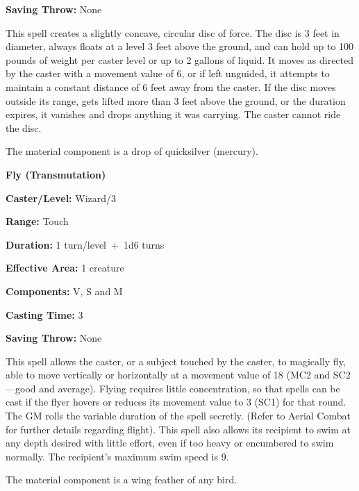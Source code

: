 \begin{multicols}{2}
\begin{minipage}{\columnwidth}
\noindent \textbf{Saving Throw:} None

\end{minipage}

This spell creates a slightly concave, circular disc of force.  The disc is 3 feet in diameter, always floats at a level 3 feet above the ground, and can hold up to 100 pounds of weight per caster level or up to 2 gallons of liquid.  It moves as directed by the caster with a movement value of 6, or if left unguided, it attempts to maintain a constant distance of 6 feet away from the caster.  If the disc moves outside its range, gets lifted more than 3 feet above the ground, or the duration expires, it vanishes and drops anything it was carrying.  The caster cannot ride the disc.

The material component is a drop of quicksilver (mercury).

\vspace{1em}

\noindent
\begin{minipage}{\columnwidth}

\noindent \textbf{Fly (Transmutation)}

\noindent \textbf{Caster/Level:} Wizard/3

\noindent \textbf{Range:} Touch

\noindent \textbf{Duration:} 1 turn/level~+~1d6 turns

\noindent \textbf{Effective Area:} 1 creature

\noindent \textbf{Components:} V, S and M

\noindent \textbf{Casting Time:} 3

\noindent \textbf{Saving Throw:} None

\end{minipage}

This spell allows the caster, or a subject touched by the caster, to magically fly, able to move vertically or horizontally at a movement value of 18 (MC2 and SC2---good and average).  Flying requires little concentration, so that spells can be cast if the flyer hovers or reduces its movement value to 3 (SC1) for that round.  The GM rolls the variable duration of the spell secretly.  (Refer to Aerial Combat for further details regarding flight).  This spell also allows its recipient to swim at any depth desired with little effort, even if too heavy or encumbered to swim normally.  The recipient's maximum swim speed is 9.

The material component is a wing feather of any bird.


\end{multicols}
